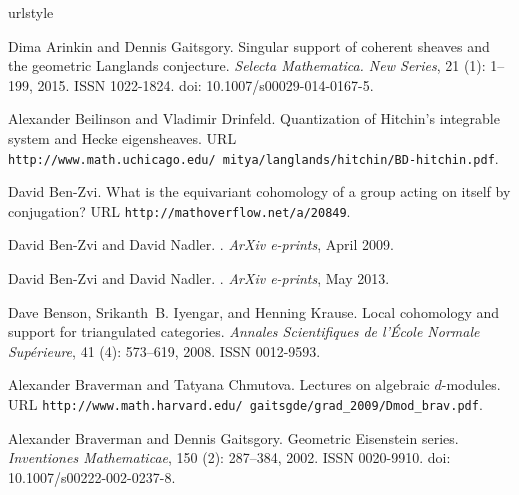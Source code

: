 \documentclass{oupau}
\theoremstyle{remark}
\begin{document}
\begin{thebibliography}{20}
\providecommand{\url}[1]{\texttt{#1}}
\expandafter\ifx\csname urlstyle\endcsname\relax
  \providecommand{\doi}[1]{doi: #1}\else
  \providecommand{\doi}{doi: \begingroup \urlstyle{rm}\Url}\fi

Dima Arinkin and Dennis Gaitsgory.
\newblock Singular support of coherent sheaves and the geometric {L}anglands
  conjecture.
\newblock \emph{Selecta Mathematica. New Series}, 21 (1):
  1--199, 2015.
\newblock ISSN 1022-1824.
\newblock \doi{10.1007/s00029-014-0167-5}.

Alexander Beilinson and Vladimir Drinfeld.
\newblock Quantization of {H}itchin's integrable system and {H}ecke
  eigensheaves.
\newblock URL
  \url{http://www.math.uchicago.edu/~mitya/langlands/hitchin/BD-hitchin.pdf}.

David Ben-Zvi.
\newblock What is the equivariant cohomology of a group acting on itself by
  conjugation?
\newblock URL \url{http://mathoverflow.net/a/20849}.

David {Ben-Zvi} and David {Nadler}.
.
\newblock \emph{ArXiv e-prints}, April 2009.

David {Ben-Zvi} and David {Nadler}.
.
\newblock \emph{ArXiv e-prints}, May 2013.

Dave Benson, Srikanth~B. Iyengar, and Henning Krause.
\newblock Local cohomology and support for triangulated categories.
\newblock \emph{Annales Scientifiques de l'École Normale Supérieure},
  41 (4): 573--619, 2008.
\newblock ISSN 0012-9593.

Alexander Braverman and Tatyana Chmutova.
\newblock Lectures on algebraic $d$-modules.
\newblock URL
  \url{http://www.math.harvard.edu/~gaitsgde/grad_2009/Dmod_brav.pdf}.

Alexander Braverman and Dennis Gaitsgory.
\newblock Geometric {E}isenstein series.
\newblock \emph{Inventiones Mathematicae}, 150 (2): 287--384,
  2002.
\newblock ISSN 0020-9910.
\newblock \doi{10.1007/s00222-002-0237-8}.


\end{thebibliography}
\end{document}
